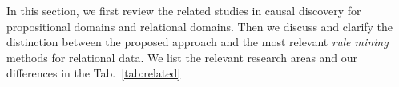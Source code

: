 In this section, we first review the related studies in causal discovery for propositional domains and relational domains. Then we discuss and clarify the distinction between the proposed approach and the most relevant  \textit{rule mining} methods for relational data.
We list the relevant research areas and our differences in the Tab.~\ref{tab:related}

\begin{table*}[ht]
\centering
\caption{Comparison of our work and related work.}
\label{tab:related}
\end{table*}



